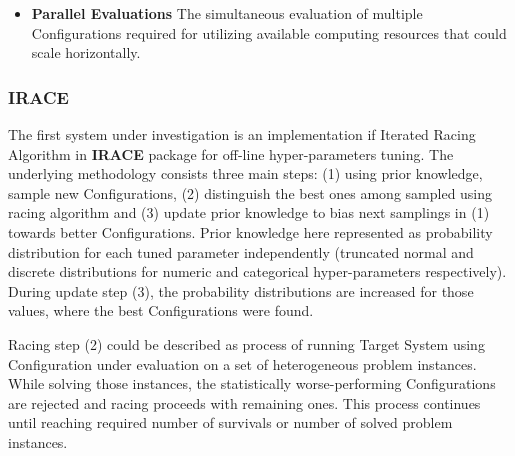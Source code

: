 \begin{itemize}
	\item \textbf{Parallel Evaluations }The simultaneous evaluation of multiple Configurations required for utilizing available computing resources that could scale horizontally. 
	
	
\end{itemize}


\subsubsection{IRACE~\cite{lopez2016irace}}\label{bg: irace}
The first system under investigation is an implementation if Iterated Racing Algorithm\cite{birattari2010f} in \textbf{IRACE} package for off-line hyper-parameters tuning.
The underlying methodology consists three main steps: (1) using prior knowledge, sample new Configurations, (2) distinguish the best ones among sampled using racing algorithm and (3) update prior knowledge to bias next samplings in (1) towards better Configurations. 
Prior knowledge here represented as probability distribution for each tuned parameter independently (truncated normal and discrete distributions for numeric and categorical hyper-parameters respectively). During update step (3), the probability distributions are increased for those values, where the best Configurations were found.

Racing step (2) could be described as process of running Target System using Configuration under evaluation on a set of heterogeneous problem instances. While solving those instances, the statistically worse-performing Configurations are rejected and racing proceeds with remaining ones. This process continues until reaching required number of survivals or number of solved problem instances. 

